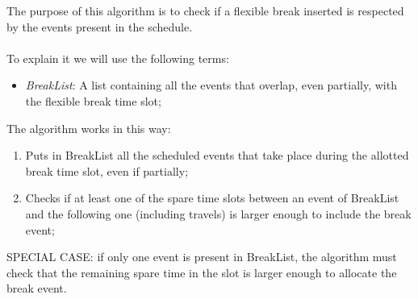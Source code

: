 The purpose of this algorithm is to check if a flexible break inserted is respected by the events present in the schedule. \\ \\
To explain it we will use the following terms: 
\begin{itemize}
	\item \textit{BreakList}: A list containing all the events that overlap, even partially, with the flexible break time slot;
\end{itemize}
The algorithm works in this way:
\begin{enumerate}
	\item Puts in BreakList all the scheduled events that take place during the allotted break time slot, even if partially;
	\item Checks if at least one of the spare time slots between an event of BreakList and the following one (including travels) is larger enough to include the break event;
\end{enumerate}	
SPECIAL CASE: if only one event is present in BreakList, the algorithm must check that the remaining spare time in the slot is larger enough to allocate the break event.